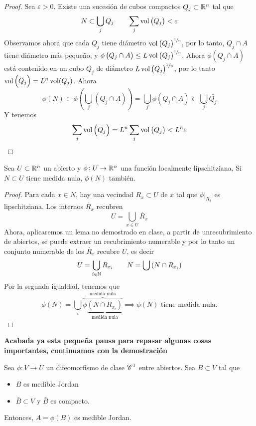 \begin{proof}
    Sea $\varepsilon > 0$. Existe una sucesión de cubos compactos $Q_j \subset \mathbb{R}^n$ tal que
    \[
        N \subset \bigcup_j Q_j \qquad \sum_j \operatorname{vol}\left( Q_j \right) < \varepsilon
    \]
    Observamos ahora que cada $Q_j$ tiene diámetro $\operatorname{vol}\left( Q_j \right)^{\sfrac{1}{n}}$, por lo tanto,
    $Q_j \cap A$ tiene diámetro más pequeño, y $\phi\left( Q_j \cap A \right) \leq L \operatorname{vol}\left( Q_j \right)^{\sfrac{1}{n}}$. Ahora
    $\phi\left( Q_j \cap A \right)$ está contenido en un cubo $\bar{Q_j}$ de diámetro $L \operatorname{vol}\left( Q_j \right)^{\sfrac{1}{n}}$, por lo tanto
    $\operatorname{vol}\left( \bar{Q_j} \right) = L^n \operatorname{vol}(Q_j)$. Ahora
    \[
        \phi(N) \subset \phi\left( \bigcup_{j} \left( Q_j \cap A \right) \right) = \bigcup_j \phi\left( Q_j \cap A \right) \subset \bigcup_j \bar{Q_j}
    \]
    Y tenemos
    \[
        \sum_j \operatorname{vol}\left( \bar{Q_j} \right) = L^n \sum_j \operatorname{vol}\left( Q_j \right) < L^n \varepsilon
    \]
\end{proof}

\begin{lema}
    Sea $U \subset \mathbb{R}^n$ un abierto y $\phi \colon U \to \mathbb{R}^n$ una función localmente lipschitziana, Si $N \subset U$ tiene
    medida nula, $\phi(N)$ tambi\'en.
\end{lema}

\begin{proof}
    Para  cada $x \in N$, hay una vecindad $R_x \subset U$ de $x$ tal que $\phi\vert_{R_x}$ es lipschitziana. Los internos $\mathring{R_x}$ recubren
    \[
        U = \bigcup_{x \in U} \mathring{R_x}
    \]
    Ahora, aplicaremos un lema no demostrado en clase, a partir de unrecubrimiento de abiertos, se puede extraer un recubrimiento numerable y por lo tanto
    un conjunto numerable de los $\mathring{R_x}$ recubre $U$, es decir
    \[
        U =\bigcup_{i \in \mathbb{N}} R_{x_i} \qquad N = \bigcup\left( N \cap R_{x_i} \right)
    \]
    Por la segunda igualdad, tenemos que
    \[
        \phi(N) =\bigcup_{i} \overbrace{\phi \underbrace{\left(N \cap R_{x_i}\right)}_{\text{medida nula}} }^{\text{medida nula}} \implies
        \phi(N) \text{ tiene medida nula.}
    \]
\end{proof}

\textbf{Acabada ya esta pequeña pausa para repasar algunas cosas importantes, continuamos con la demostración}

\begin{lema}[(0)]\label{lema:cero_cambio}
    Sea $\phi \colon V \to U$ un difeomorfismo de clase $\mathscr{C}^1$ entre abiertos. Sea $B \subset V$ tal que
    \begin{itemize}
        \item $B$ es medible Jordan
        \item $\bar{B} \subset V$ y $\bar{B}$ es compacto.
    \end{itemize}
    Entonces, $A = \phi(B)$ es medible Jordan.
\end{lema}

